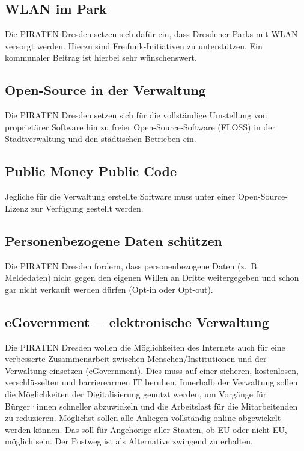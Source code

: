 \documentclass[a4paper, 11pt]{article}
\begin{document}
\subsection{WLAN im Park}
Die PIRATEN Dresden setzen sich dafür ein, dass Dresdener Parks mit WLAN versorgt werden. Hierzu sind Freifunk-Initiativen zu unterstützen. Ein kommunaler Beitrag ist hierbei sehr wünschenswert.

\subsection{Open-Source in der Verwaltung}
Die PIRATEN Dresden setzen sich für die vollständige Umstellung von proprietärer Software hin zu freier Open-Source-Software (FLOSS) in der Stadtverwaltung und den städtischen Betrieben ein.

\subsection{Public Money Public Code}
Jegliche für die Verwaltung erstellte Software muss unter einer Open-Source-Lizenz zur Verfügung gestellt werden.

\subsection{Personenbezogene Daten schützen}
Die PIRATEN Dresden fordern, dass personenbezogene Daten (z. B. Meldedaten) nicht gegen den eigenen Willen an Dritte weitergegeben und schon gar nicht verkauft werden dürfen (Opt-in oder Opt-out).

\subsection{eGovernment $-$ elektronische Verwaltung}
Die PIRATEN Dresden wollen die Möglichkeiten des Internets auch für eine verbesserte Zusammenarbeit zwischen Menschen/Institutionen und der Verwaltung einsetzen (eGovernment). Dies muss auf einer sicheren, kostenlosen, verschlüsselten und barrierearmen IT beruhen. Innerhalb der Verwaltung sollen die Möglichkeiten der Digitalisierung genutzt werden, um Vorgänge für Bürger·innen schneller abzuwickeln und die Arbeitslast für die Mitarbeitenden zu reduzieren. Möglichst sollen alle Anliegen vollständig online abgewickelt werden können. Das soll für Angehörige aller Staaten, ob EU oder nicht-EU, möglich sein. Der Postweg ist als Alternative zwingend zu erhalten.
\end{document}
